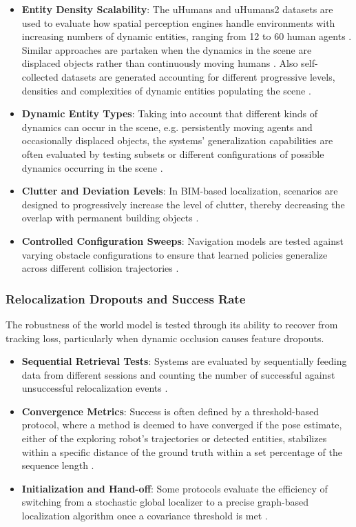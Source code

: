 \begin{itemize}
    \item \textbf{Entity Density Scalability}: The uHumans and uHumans2 datasets are used to evaluate how spatial perception engines handle environments with increasing numbers of dynamic entities, ranging from 12 to 60 human agents \cite{rosinol_3d_2020}. Similar approaches are partaken when the dynamics in the scene are displaced objects rather than continuously moving humans \cite{ferraina_lost-3dsg_2026}. Also self-collected datasets are generated accounting for different progressive levels, densities and complexities of dynamic entities populating the scene \cite{giberna_dynemo-slam_2025}.
    \item \textbf{Dynamic Entity Types}: Taking into account that different kinds of dynamics can occur in the scene, e.g. persistently moving agents and occasionally displaced objects, the systems' generalization capabilities are often evaluated by testing  subsets or different configurations of possible dynamics occurring in the scene \cite{giberna_dynemo-slam_2025}.
    \item \textbf{Clutter and Deviation Levels}: In BIM-based localization, scenarios are designed to progressively increase the level of clutter, thereby decreasing the overlap with permanent building objects \cite{vega_torres_bim-slam_2023} \cite{shaheer_tightly_2025}.
    \item \textbf{Controlled Configuration Sweeps}: Navigation models are tested against varying obstacle configurations to ensure that learned policies generalize across different collision trajectories \cite{maguire_lidar-only_2025}. 
\end{itemize}

\subsubsection{Relocalization Dropouts and Success Rate}
The robustness of the world model is tested through its ability to recover from tracking loss, particularly when dynamic occlusion causes feature dropouts. 

\begin{itemize}
    \item \textbf{Sequential Retrieval Tests}: Systems are evaluated by sequentially feeding data from different sessions and counting the number of successful against unsuccessful relocalization events \cite{wang_semantic_2023}.
    \item \textbf{Convergence Metrics}: Success is often defined by a threshold-based protocol, where a method is deemed to have converged if the pose estimate, either of the exploring robot's trajectories or detected entities, stabilizes within a specific distance of the ground truth within a set percentage of the sequence length\cite{vega_torres_bim-slam_2023} \cite{morris_importance_2024}.
    \item \textbf{Initialization and Hand-off}: Some protocols evaluate the efficiency of switching from a stochastic global localizer to a precise graph-based localization algorithm once a covariance threshold is met \cite{scherer_ogm2pgbm_2023}.
\end{itemize}

